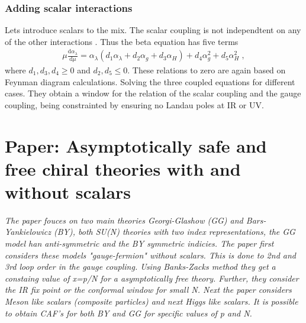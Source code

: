 \subsubsection{Adding scalar interactions}
Lets introduce scalars to the mix. The scalar coupling is not independtent on any of the other interactions . Thus the beta equation has five terms
\begin{align}
    \mu \frac{\mathrm{d} \alpha_\lambda}{\mathrm{d} \mu}=\alpha_\lambda (d_1\alpha_\lambda+d_2 \alpha_g+d_3 \alpha_H)+d_4\alpha_g^2 +d_5\alpha^2_H\;,
\end{align}
where $d_1,d_3,d_4 \geq0$ and $d_2,d_5\leq0$. These relations to zero are again based on Feynman diagram calculations. Solving the three coupled equations for different cases. They obtain a window for the relation of the scalar coupling and the gauge coupling, being constrainted by ensuring no Landau poles at IR or UV. 


\section{Paper: Asymptotically safe and free chiral theories with and without scalars}

\textit{The paper fouces on two main theories Georgi-Glashow (GG) and Bars-Yankielowicz (BY), both SU(N) theories with two index representations, the GG model han anti-symmetric and the BY symmetric indicies. The paper first considers these models "gauge-fermion" without scalars. This is done to 2nd and 3rd loop order in the gauge coupling. Using Banks-Zacks method they get a constaing value of x=p/N for a asymptotically free theory. Further, they consider the IR fix point or the conformal window for small N. Next the paper considers Meson like scalars (composite particles) and next Higgs like scalars. It is possible to obtain CAF's for both BY and GG for specific values of p and N.}

